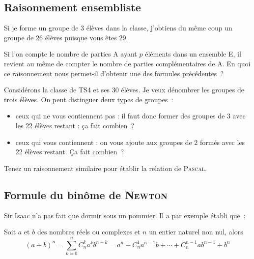 \documentclass[french]{book}
\newcommand{\co}[2]{C_#2^#1}
\begin{document}


\newpage
\subsection{Raisonnement ensembliste}

Si je forme un groupe de 3 élèves dans la classe, j'obtiens du même coup un groupe de 26 élèves puisque vous êtes 29.

Si l'on compte le nombre de parties A ayant $p$ éléments dans un ensemble E, il revient au même de compter le nombre de parties
complémentaires de A. En quoi ce raisonnement nous permet-il d'obtenir une des formules précédentes~?




Considérons la classe de TS4 et ses 30 élèves. Je veux dénombrer les groupes de trois élèves. On peut distinguer deux types de
groupes~:

\begin{itemize}
\item ceux qui ne vous contiennent pas : il faut donc former des groupes de 3 avec les 22 élèves restant : ça fait combien~?
\item ceux qui vous contiennent : on vous ajoute aux groupes de 2 formés avec les 22 élèves restant. Ça fait combien~?
\end{itemize}



Tenez   un  raisonnement   similaire   pour  établir   la  relation   de
\textsc{Pascal}.



\subsection{Formule du binôme de \textsc{Newton}}

Sir Isaac  n'a pas  fait que dormir  sous un  pommier. Il a  par exemple
établi que~:


\begin{thm}
   Soit $a$ et $b$ des nombres réels ou complexes et $n$ un entier naturel non nul, alors
$$(a+b)^n=\sum_{k=0}^n\co{k}{n}a^kb^{n-k}=a^n+\co{1}{n}a^{n-1}b+\cdots+\co{{n-1}}{n}ab^{n-1}+b^n$$
\end{thm}
\end{document}

